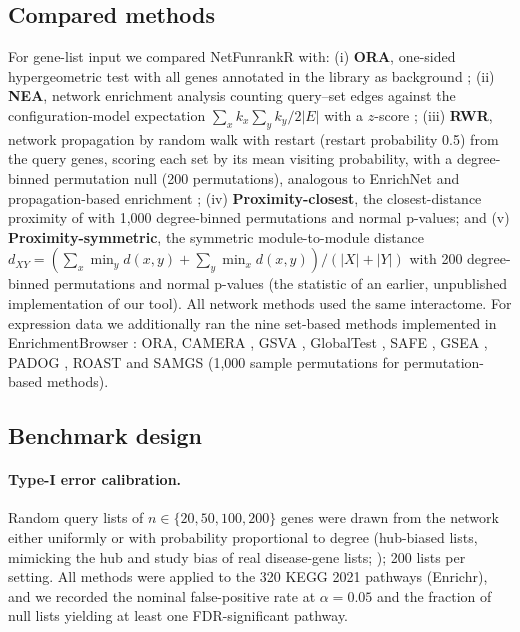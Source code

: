 \subsection{Compared methods}\label{sec:competitors}
For gene-list input we compared NetFunrankR with: (i) \textbf{ORA}, one-sided hypergeometric test with all genes annotated in the library as background \citep{Huang2009}; (ii) \textbf{NEA}, network enrichment analysis counting query--set edges against the configuration-model expectation $\sum_{x} k_x \sum_{y} k_y / 2|E|$ with a $z$-score \citep{Alexeyenko2012}; (iii) \textbf{RWR}, network propagation by random walk with restart (restart probability 0.5) from the query genes, scoring each set by its mean visiting probability, with a degree-binned permutation null (200 permutations), analogous to EnrichNet \citep{Glaab2012} and propagation-based enrichment \citep{Cowen2017}; (iv) \textbf{Proximity-closest}, the closest-distance proximity of \citet{Guney2016} with 1{,}000 degree-binned permutations and normal p-values; and (v) \textbf{Proximity-symmetric}, the symmetric module-to-module distance $d_{XY} = \left(\sum_{x} \min_{y} d(x,y) + \sum_{y} \min_{x} d(x,y)\right)/(|X|+|Y|)$ \citep{Menche2015} with 200 degree-binned permutations and normal p-values (the statistic of an earlier, unpublished implementation of our tool). All network methods used the same interactome. For expression data we additionally ran the nine set-based methods implemented in EnrichmentBrowser \citep{Geistlinger2016}: ORA, CAMERA \citep{Wu2012}, GSVA \citep{Hanzelmann2013}, GlobalTest \citep{Goeman2004}, SAFE \citep{Barry2005}, GSEA \citep{Subramanian2005}, PADOG \citep{Tarca2012}, ROAST \citep{Wu2010} and SAMGS \citep{Dinu2007} (1{,}000 sample permutations for permutation-based methods).

\subsection{Benchmark design}
\paragraph{Type-I error calibration.}\label{sec:calib_methods}
Random query lists of $n \in \{20, 50, 100, 200\}$ genes were drawn from the network either uniformly or with probability proportional to degree (hub-biased lists, mimicking the hub and study bias of real disease-gene lists; \citealp{Haynes2018}); 200 lists per setting. All methods were applied to the 320 KEGG 2021 pathways (Enrichr), and we recorded the nominal false-positive rate at $\alpha = 0.05$ and the fraction of null lists yielding at least one FDR-significant pathway.


